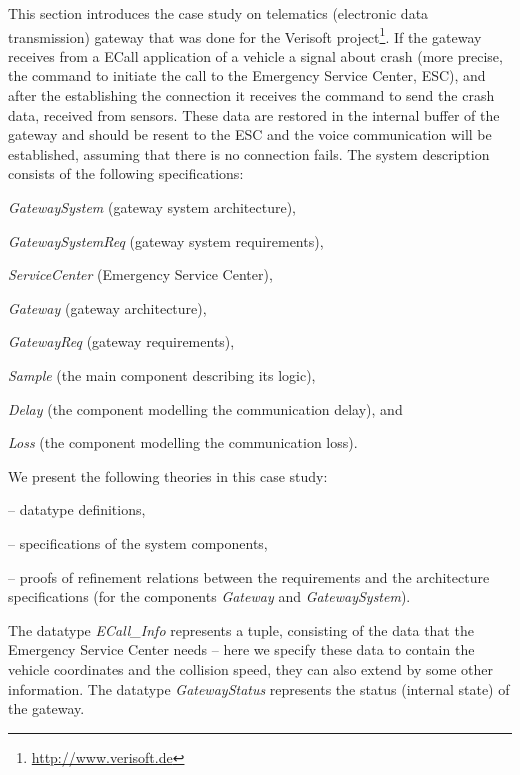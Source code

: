 This section introduces the case study on telematics 
(electronic data transmission) gateway that was done for the 
Verisoft project\footnote{\url{http://www.verisoft.de}}. 
If the gateway receives from a ECall application of a vehicle
a signal about crash 
(more precise, the command to initiate the call to the Emergency Service Center, ESC), 
and after the establishing the connection it receives 
 the command to send the crash data, received from sensors.
These data are restored 
 in the internal buffer of the gateway  and should  
 be resent to the ESC and 
 the voice communication will be established, assuming that
	there is no connection fails.  
The system description consists of the following specifications: 
\begin{itemize*}
	\item \emph{GatewaySystem} (gateway system architecture), 
	\item \emph{GatewaySystemReq} (gateway system requirements), 
	\item \emph{ServiceCenter} (Emergency Service Center),
	\item \emph{Gateway} (gateway architecture), 
	\item \emph{GatewayReq} (gateway requirements),
	\item \emph{Sample} (the main  component describing its logic), 
	\item \emph{Delay} (the  component   modelling the communication delay), and
	\item \emph{Loss} (the  component modelling the communication loss).  
\end{itemize*}
%  
We present the following \isah theories in this case study:
\begin{itemize*}
  \item {} --  datatype definitions, 
	\item {} --  specifications of the system components, 
	\item {} --  proofs of refinement relations between the requirements and the architecture specifications (for the components \emph{Gateway} and \emph{GatewaySystem}).
\end{itemize*}
%
The datatype \emph{ECall\_Info} represents a tuple, 
consisting of the data that the Emergency Service Center needs -- here we specify these data to contain the vehicle coordinates and the collision speed, they can also extend by some other information.  
The datatype \emph{GatewayStatus} represents the status (internal state) of the gateway.

